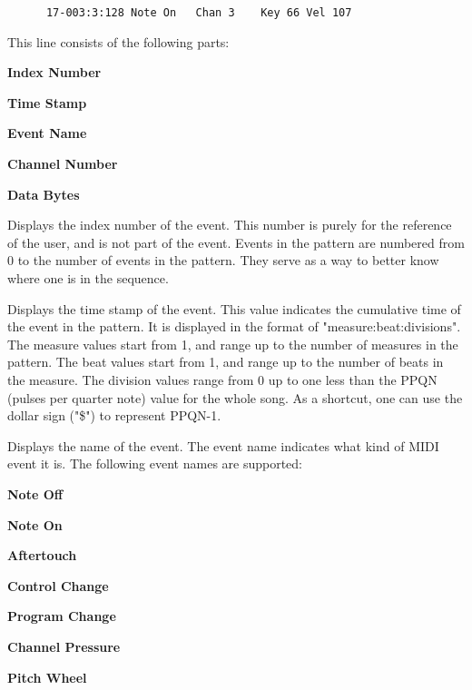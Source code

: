    \begin{verbatim}
      17-003:3:128 Note On   Chan 3    Key 66 Vel 107
   \end{verbatim}

   This line consists of the following parts:

   \begin{enumber}
      \item \textbf{Index Number}
      \item \textbf{Time Stamp}
      \item \textbf{Event Name}
      \item \textbf{Channel Number}
      \item \textbf{Data Bytes}
   \end{enumber}

   \setcounter{ItemCounter}{0}      %

   Displays the index number of the event.
   This number is purely for the reference of the user, and is not part
   of the event.  Events in the pattern are numbered from 0 to the number of
   events in the pattern.  They serve as a way to better know where one is in
   the sequence.

   Displays the time stamp of the event.
   This value indicates the cumulative time of the event in the pattern.
   It is displayed in the format of "measure:beat:divisions".
   The measure values start from 1, and range up to the number of measures in
   the pattern.
   The beat values start from 1, and range up to the number of beats in the
   measure.
   The division values range from 0 up to one less than the
   PPQN (pulses per quarter note) value for the whole song.
   As a shortcut, one can use the dollar sign ("\$") to represent
   PPQN-1.

   Displays the name of the event.
   The event name indicates what kind of MIDI event it is. 
   The following event names are supported:

   \begin{enumber}
      \item \textbf{Note Off}
      \item \textbf{Note On}
      \item \textbf{Aftertouch}
      \item \textbf{Control Change}
      \item \textbf{Program Change}
      \item \textbf{Channel Pressure}
      \item \textbf{Pitch Wheel}
   \end{enumber}

